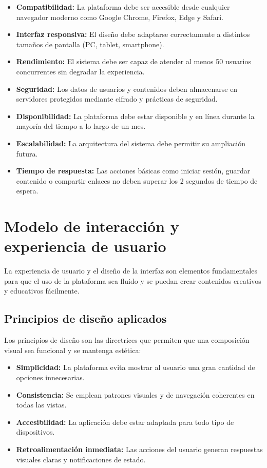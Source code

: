 \documentclass[12pt,a4paper]{report}
\begin{document}
\begin{itemize}
\item \textbf{Compatibilidad:} La plataforma debe ser accesible desde cualquier navegador moderno como Google Chrome, Firefox, Edge y Safari.

\item \textbf{Interfaz responsiva:} El diseño debe adaptarse correctamente a distintos tamaños de pantalla (PC, tablet, smartphone).

\item \textbf{Rendimiento:} El sistema debe ser capaz de atender al menos 50 usuarios concurrentes sin degradar la experiencia.

\item \textbf{Seguridad:} Los datos de usuarios y contenidos deben almacenarse en servidores protegidos mediante cifrado y prácticas de seguridad.

\item \textbf{Disponibilidad:} La plataforma debe estar disponible y en línea durante la mayoría del tiempo a lo largo de un mes.

\item \textbf{Escalabilidad:} La arquitectura del sistema debe permitir su ampliación futura.

\item \textbf{Tiempo de respuesta:} Las acciones básicas como iniciar sesión, guardar contenido o compartir enlaces no deben superar los 2 segundos de tiempo de espera.
\end{itemize}

\section{Modelo de interacción y experiencia de usuario}

La experiencia de usuario y el diseño de la interfaz son elementos fundamentales para que el uso de la plataforma sea fluido y se puedan crear contenidos creativos y educativos fácilmente.

\subsection{Principios de diseño aplicados}

Los principios de diseño son las directrices que permiten que una composición visual sea funcional y se mantenga estética:

\begin{itemize}
\item \textbf{Simplicidad:} La plataforma evita mostrar al usuario una gran cantidad de opciones innecesarias.

\item \textbf{Consistencia:} Se emplean patrones visuales y de navegación coherentes en todas las vistas.

\item \textbf{Accesibilidad:} La aplicación debe estar adaptada para todo tipo de dispositivos.

\item \textbf{Retroalimentación inmediata:} Las acciones del usuario generan respuestas visuales claras y notificaciones de estado.
\end{itemize}
\end{document}
